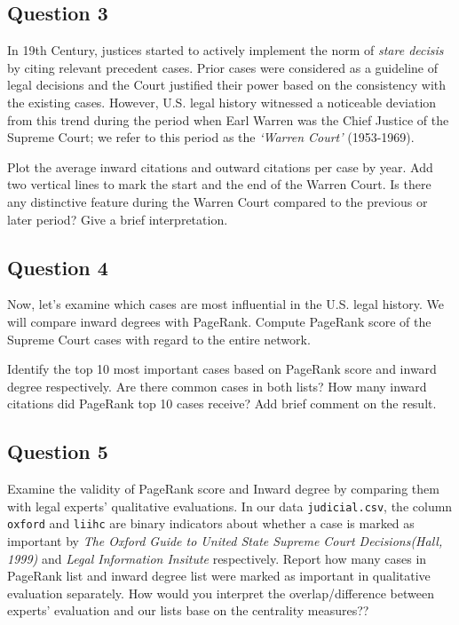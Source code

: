 \documentclass[]{article}
\begin{document}
\subsection{Question 3}\label{question-3}

In 19th Century, justices started to actively implement the norm of
\emph{stare decisis} by citing relevant precedent cases. Prior cases
were considered as a guideline of legal decisions and the Court
justified their power based on the consistency with the existing cases.
However, U.S. legal history witnessed a noticeable deviation from this
trend during the period when Earl Warren was the Chief Justice of the
Supreme Court; we refer to this period as the \emph{`Warren Court'}
(1953-1969).

Plot the average inward citations and outward citations per case by
year. Add two vertical lines to mark the start and the end of the Warren
Court. Is there any distinctive feature during the Warren Court compared
to the previous or later period? Give a brief interpretation.

\subsection{Question 4}\label{question-4}

Now, let's examine which cases are most influential in the U.S. legal
history. We will compare inward degrees with PageRank. Compute PageRank
score of the Supreme Court cases with regard to the entire network.

Identify the top 10 most important cases based on PageRank score and
inward degree respectively. Are there common cases in both lists? How
many inward citations did PageRank top 10 cases receive? Add brief
comment on the result.

\subsection{Question 5}\label{question-5}

Examine the validity of PageRank score and Inward degree by comparing
them with legal experts' qualitative evaluations. In our data
\texttt{judicial.csv}, the column \texttt{oxford} and \texttt{liihc} are
binary indicators about whether a case is marked as important by
\emph{The Oxford Guide to United State Supreme Court Decisions(Hall,
1999)} and \emph{Legal Information Insitute} respectively. Report how
many cases in PageRank list and inward degree list were marked as
important in qualitative evaluation separately. How would you interpret
the overlap/difference between experts' evaluation and our lists base on
the centrality measures??
\end{document}
